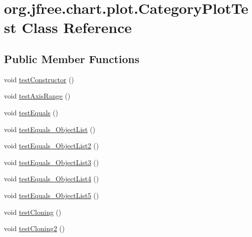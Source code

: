 \hypertarget{classorg_1_1jfree_1_1chart_1_1plot_1_1_category_plot_test}{}\section{org.\+jfree.\+chart.\+plot.\+Category\+Plot\+Test Class Reference}
\label{classorg_1_1jfree_1_1chart_1_1plot_1_1_category_plot_test}
\subsection*{Public Member Functions}
\begin{DoxyCompactItemize}
\item 
void \mbox{\hyperlink{classorg_1_1jfree_1_1chart_1_1plot_1_1_category_plot_test_ae9356bcc3db1836e58ea66dadb053f55}{test\+Constructor}} ()
\item 
void \mbox{\hyperlink{classorg_1_1jfree_1_1chart_1_1plot_1_1_category_plot_test_a63eed4f05af28be25d63f70f4840562b}{test\+Axis\+Range}} ()
\item 
void \mbox{\hyperlink{classorg_1_1jfree_1_1chart_1_1plot_1_1_category_plot_test_a019df3bab992ac3aab6c566a01f7c4f4}{test\+Equals}} ()
\item 
void \mbox{\hyperlink{classorg_1_1jfree_1_1chart_1_1plot_1_1_category_plot_test_ac1e4396105696babb3e8f20547d187fb}{test\+Equals\+\_\+\+Object\+List}} ()
\item 
void \mbox{\hyperlink{classorg_1_1jfree_1_1chart_1_1plot_1_1_category_plot_test_a0936154f50b4c5a6417b988bce855517}{test\+Equals\+\_\+\+Object\+List2}} ()
\item 
void \mbox{\hyperlink{classorg_1_1jfree_1_1chart_1_1plot_1_1_category_plot_test_af9b4deade507c91d502d364c0c760aba}{test\+Equals\+\_\+\+Object\+List3}} ()
\item 
void \mbox{\hyperlink{classorg_1_1jfree_1_1chart_1_1plot_1_1_category_plot_test_a724f901d91155963d3b145d794ca575e}{test\+Equals\+\_\+\+Object\+List4}} ()
\item 
void \mbox{\hyperlink{classorg_1_1jfree_1_1chart_1_1plot_1_1_category_plot_test_ac0f01484920724bca99c8c6b0d7a8e76}{test\+Equals\+\_\+\+Object\+List5}} ()
\item 
void \mbox{\hyperlink{classorg_1_1jfree_1_1chart_1_1plot_1_1_category_plot_test_a86de42c433bc15c407e8107c27d5050a}{test\+Cloning}} ()
\item 
void \mbox{\hyperlink{classorg_1_1jfree_1_1chart_1_1plot_1_1_category_plot_test_a0e87e8a9265cd9befc1e1d2fceb03985}{test\+Cloning2}} ()

\end{DoxyCompactItemize}
